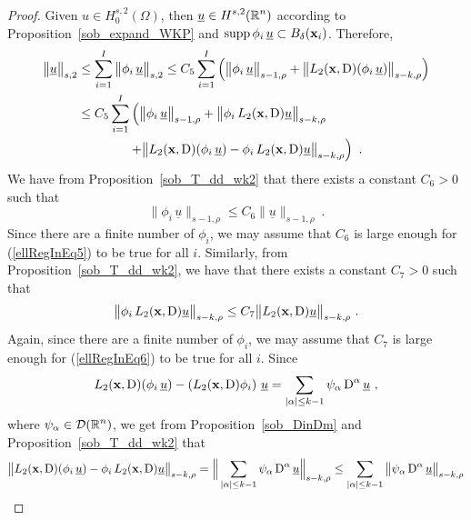 \begin{proof}
Given $\displaystyle u \in H^{s,2}_0(\Omega)$, then
$\displaystyle \underline{u} \in H^{s,2}(\mathbb{R}^n)$ according to
Proposition~\ref{sob_expand_WKP}
and $\operatorname{supp} \phi_i\,\underline{u} \subset B_\delta(\mathbf{x}_i)$.  Therefore,
\begin{align}
\big\|\underline{u}\big\|_{s,2}
& \leq \sum_{i=1}^I \big\|\phi_i\,\underline{u}\big\|_{s,2}
\leq C_5 \sum_{i=1}^I \left( \big\|\phi_i\,\underline{u}\big\|_{s-1,\rho} +
\big\|L_2(\mathbf{x},\operatorname{D})(\phi_i\,\underline{u})\big\|_{s-k,\rho} \right)
\nonumber \\
&\leq C_5 \sum_{i=1}^I \left( \big\|\phi_i\,\underline{u}\big\|_{s-1,\rho}
+ \big\|\phi_i \, L_2(\mathbf{x},\operatorname{D})\underline{u} \big\|_{s-k,\rho}
\right. \nonumber \\
&\qquad \qquad \left. + \big\|L_2(\mathbf{x},\operatorname{D})(\phi_i\,\underline{u})
- \phi_i\, L_2(\mathbf{x},\operatorname{D})\underline{u} \big\|_{s-k,\rho} \right) \ .
\label{ellRegInEq4}
\end{align}
We have from Proposition~\ref{sob_T_dd_wk2} that there exists
a constant $C_6>0$ such that
\begin{equation} \label{ellRegInEq5}
\big\|\phi_i\,\underline{u}\big\|_{s-1,\rho}
\leq C_6 \big\|\underline{u}\big\|_{s-1,\rho} \ .
\end{equation}
Since there are a finite number of $\phi_i$, we may assume that $C_6$
is large enough for (\ref{ellRegInEq5}) to be true for all $i$.
Similarly, from Proposition~\ref{sob_T_dd_wk2}, we have that there exists
a constant $C_7>0$ such that
\begin{equation} \label{ellRegInEq6}
\big\|\phi_i\, L_2(\VEC{x},\diff)\underline{u}\big\|_{s-k,\rho}
\leq C_7 \big\|L_2(\VEC{x},\diff)\underline{u}\big\|_{s-k,\rho} \ .
\end{equation}
Again, since there are a finite number of $\phi_i$, we may assume that $C_7$
is large enough for (\ref{ellRegInEq6}) to be true for all $i$.
Since
\[
L_2(\VEC{x},\diff)(\phi_i\,\underline{u})
- \left(L_2(\VEC{x},\diff)\phi_i\right) \,\underline{u}
= \sum_{|\alpha|\leq k-1} \psi_{\alpha} \diff^\alpha \underline{u} \ ,
\]
where $\displaystyle \psi_\alpha \in \mathcal{D}(\mathbb{R}^n)$, we get from
Proposition~\ref{sob_DinDm} and Proposition~\ref{sob_T_dd_wk2} that
\begin{align}
&\big\|L_2(\VEC{x},\diff)(\phi_i\,\underline{u})
- \phi_i\, L_2(\VEC{x},\diff)\underline{u} \big\|_{s-k,\rho}
= \Big\| \sum_{|\alpha|\leq k-1} \psi_{\alpha} \diff^\alpha \underline{u}
\Big\|_{s-k,\rho}
\leq \sum_{|\alpha|\leq k-1} \big\| \psi_{\alpha} \diff^\alpha \underline{u}
\big\|_{s-k,\rho} \nonumber \\

\end{align}
\end{proof}
